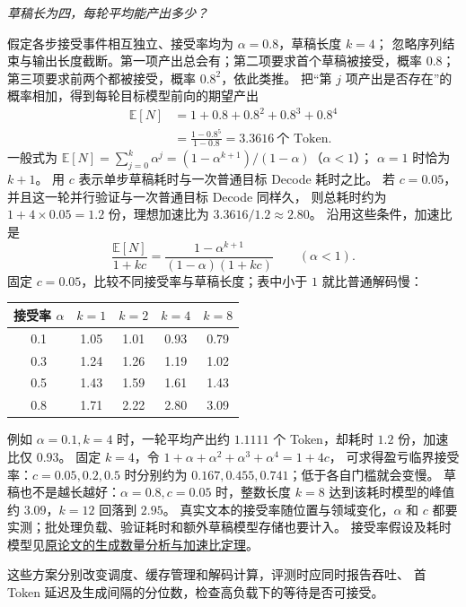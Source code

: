 \begin{example}
\noindent\emph{草稿长为四，每轮平均能产出多少？}\par
假定各步接受事件相互独立、接受率均为 $\alpha=0.8$，草稿长度 $k=4$；
忽略序列结束与输出长度截断。第一项产出总会有；第二项要求首个草稿被接受，概率 $0.8$；
第三项要求前两个都被接受，概率 $0.8^2$，依此类推。
把“第 $j$ 项产出是否存在”的概率相加，得到每轮目标模型前向的期望产出
\[
\begin{aligned}
\mathbb E[N]&=1+0.8+0.8^2+0.8^3+0.8^4\\
&=\frac{1-0.8^5}{1-0.8}=\boxed{3.3616}\ \text{个 Token}.
\end{aligned}
\]
一般式为 $\mathbb E[N]=\sum_{j=0}^{k}\alpha^j=(1-\alpha^{k+1})/(1-\alpha)$（$\alpha<1$）；
$\alpha=1$ 时恰为 $k+1$。
用 $c$ 表示单步草稿耗时与一次普通目标 Decode 耗时之比。
若 $c=0.05$，并且这一轮并行验证与一次普通目标 Decode 同样久，
则总耗时约为 $1+4\times0.05=1.2$ 份，理想加速比为 $3.3616/1.2\approx2.80$。
沿用这些条件，加速比是
\[
\frac{\mathbb E[N]}{1+kc}
=\frac{1-\alpha^{k+1}}{(1-\alpha)(1+kc)}\qquad(\alpha<1).
\]
固定 $c=0.05$，比较不同接受率与草稿长度；表中小于 $1$ 就比普通解码慢：
\begin{center}\small
{}
\begin{tabular}{@{}ccccc@{}}
\toprule
接受率 $\alpha$ & $k=1$ & $k=2$ & $k=4$ & $k=8$\\\midrule
0.1 & 1.05 & 1.01 & 0.93 & 0.79\\
0.3 & 1.24 & 1.26 & 1.19 & 1.02\\
0.5 & 1.43 & 1.59 & 1.61 & 1.43\\
0.8 & 1.71 & 2.22 & 2.80 & 3.09\\
\bottomrule
\end{tabular}
\end{center}
例如 $\alpha=0.1,k=4$ 时，一轮平均产出约 $1.1111$ 个 Token，却耗时 $1.2$ 份，加速比仅 $0.93$。
固定 $k=4$，令 $1+\alpha+\alpha^2+\alpha^3+\alpha^4=1+4c$，
可求得盈亏临界接受率：$c=0.05,0.2,0.5$ 时分别约为 $0.167,0.455,0.741$；低于各自门槛就会变慢。
草稿也不是越长越好：$\alpha=0.8,c=0.05$ 时，整数长度 $k=8$ 达到该耗时模型的峰值约 $3.09$，$k=12$ 回落到 $2.95$。
真实文本的接受率随位置与领域变化，$\alpha$ 和 $c$ 都要实测；批处理负载、验证耗时和额外草稿模型存储也要计入。
接受率假设及耗时模型见\hyperref[source:speculative-decoding]{原论文的生成数量分析与加速比定理}。
\end{example}
这些方案分别改变调度、缓存管理和解码计算，评测时应同时报告吞吐、
首 Token 延迟及生成间隔的分位数，检查高负载下的等待是否可接受。

